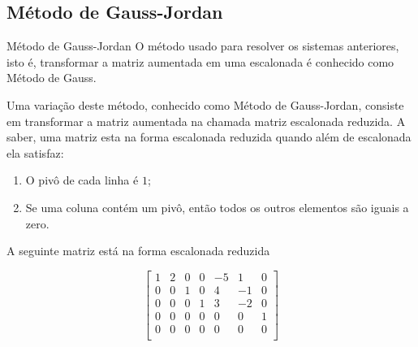 \subsection*{Método de Gauss-Jordan}

\begin{frame}{Método de Gauss-Jordan}
O método usado para resolver os sistemas anteriores, isto é, transformar a matriz aumentada em uma escalonada é conhecido como {\color{blue} Método de Gauss}.
\medskip

Uma variação deste método, conhecido como {\color{blue} Método de Gauss-Jordan}, consiste em transformar a matriz aumentada na chamada {\color{blue} matriz escalonada reduzida}. A saber, uma matriz esta na forma {\color{blue}escalonada reduzida} quando além de escalonada ela satisfaz:
\begin{block}{ }
\begin{enumerate}[a]
\item O pivô de cada linha é $1$;
\item Se uma coluna contém um pivô, então todos os outros elementos são iguais a zero.
\end{enumerate}
\end{block}
\end{frame}

\begin{frame}[label=sistemas]
A seguinte matriz está na forma escalonada reduzida

\[
\begin{bmatrix}
1& 2 & 0 & 0& -5 & 1 & 0 \\
0& 0 & 1 & 0 & 4 & -1 & 0\\
0& 0& 0& 1 & 3& -2& 0\\
0& 0& 0& 0 & 0& 0& 1\\
0& 0& 0& 0 & 0& 0& 0\\
\end{bmatrix}
\]
\end{frame}

